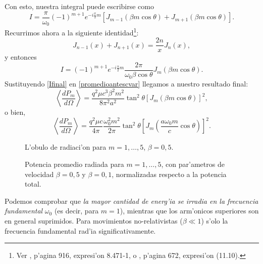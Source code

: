 Con esto, nuestra integral puede escribirse como
\begin{equation}
I=\frac{\pi}{\omega_0}(-1)^{m+1}e^{-i\frac{\pi}{2}m}\left[J_{m-1}\left(\beta
m\cos\theta\right)+J_{m+1}\left(\beta m\cos\theta\right)  \right]  .
\end{equation}
Recurrimos ahora a la siguiente identidad\footnote{Ver \cite{GR00}, p'agina 916, expresi'on 8.471-1, o \cite{AW01}, p'agina 672, expresi'on (11.10).}:
\begin{equation}
J_{n-1}(x)  +J_{n+1}(x)  =\frac{2n}{x}J_{n}\left(
x\right)  ,
\end{equation}
y entonces
\begin{equation}\label{Ifinal}
I=(-1)^{m+1}e^{-i\frac{\pi}{2}m}\frac{2\pi}{\omega_0\beta\cos\theta}J_{m}\left(  \beta m\cos\theta\right).
\end{equation}
Sustituyendo \eqref{Ifinal} en \eqref{promedioantescvar} llegamos a nuestro
resultado final:
\begin{equation}
\left\langle \frac{dP_{m}}{d\Omega}\right\rangle
=\frac{q^2\mu c^3\beta^2m^2}{8\pi^2 a^2}\tan^2\theta\left[  J_{m}\left(\beta
m\cos\theta\right)\right]^2,
\end{equation}
o bien,
\begin{equation}
\boxed{\left\langle \frac{dP_{m}}{d\Omega}\right\rangle
=\frac{q^2\mu c}{4\pi}\frac{\omega_0^2m^2}{2\pi}\tan^2\theta\left[ J_{m}\left(\frac{a\omega_0
m}{c}\cos\theta\right)  \right]^2.}
\end{equation}
\begin{figure}[ht]
\centerline{}
 \caption{L'obulo de radiaci'on para $m=1,\dots,5$, $\beta=0,5$.}
\label{TER2}
\end{figure}
\begin{figure}[ht]
\centerline{}
 \caption{Potencia promedio radiada para $m=1,\dots,5$, con par'ametros de velocidad $\beta=0,5$ y  $\beta=0,1$, normalizadas respecto a la potencia total.}
\label{TER3}
\end{figure}
Podemos comprobar que \textit{la mayor cantidad de energ'ia se irradia en la
frecuencia fundamental} $\omega_0$ (es decir, para $m=1$), mientras que los
arm'onicos superiores son en general suprimidos. Para movimientos
no-relativistas ($\beta\ll 1$) s'olo la frecuencia fundamental rad'ia
significativamente.

